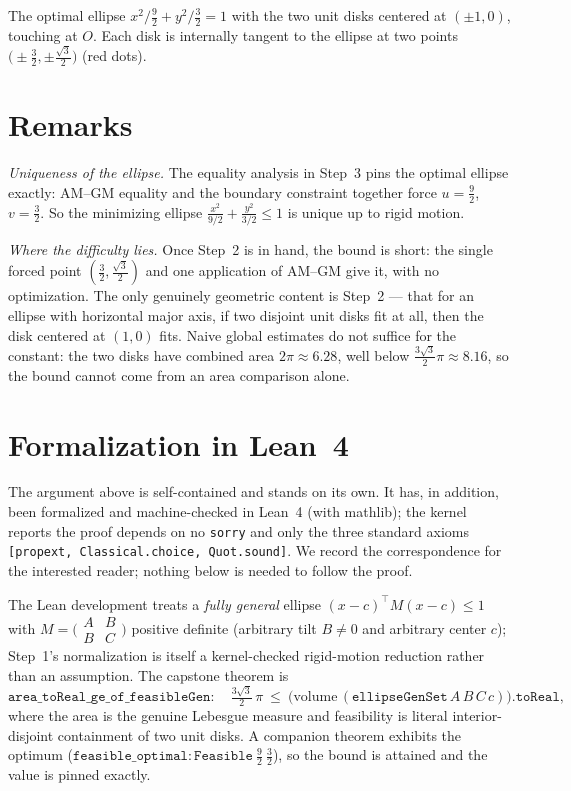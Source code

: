 \documentclass[11pt]{article}
\begin{document}
\noindent The optimal ellipse $x^2/\tfrac92+y^2/\tfrac32=1$ with the two unit disks
centered at $(\pm1,0)$, touching at $O$. Each disk is internally tangent to the ellipse at
two points $\bigl(\pm\tfrac32,\pm\tfrac{\sqrt3}{2}\bigr)$ (red dots).

\section*{Remarks}

\emph{Uniqueness of the ellipse.} The equality analysis in Step~3 pins the optimal ellipse exactly:
AM--GM equality and the boundary constraint together force $u=\tfrac92$, $v=\tfrac32$. So the
minimizing ellipse $\tfrac{x^2}{9/2}+\tfrac{y^2}{3/2}\le1$ is unique up to rigid motion.

\emph{Where the difficulty lies.} Once Step~2 is in hand, the bound is short: the single forced point
$(\tfrac32,\tfrac{\sqrt3}{2})$ and one application of AM--GM give it, with no optimization. The only
genuinely geometric content is Step~2 --- that for an ellipse with horizontal major axis, if two
disjoint unit disks fit at all, then the disk centered at $(1,0)$ fits. Naive global estimates do not
suffice for the constant: the two disks have combined area $2\pi\approx6.28$, well below
$\tfrac{3\sqrt3}{2}\pi\approx8.16$, so the bound cannot come from an area comparison alone.

\section*{Formalization in Lean~4}

The argument above is self-contained and stands on its own. It has, in addition, been formalized and
machine-checked in Lean~4 (with mathlib); the kernel reports the proof depends on no \texttt{sorry}
and only the three standard axioms \texttt{[propext, Classical.choice, Quot.sound]}. We record the
correspondence for the interested reader; nothing below is needed to follow the proof.

The Lean development treats a \emph{fully general} ellipse $(x-c)^{\!\top}M(x-c)\le1$ with
$M=\bigl(\begin{smallmatrix}A&B\\ B&C\end{smallmatrix}\bigr)$ positive definite (arbitrary tilt
$B\neq0$ and arbitrary center $c$); Step~1's normalization is itself a kernel-checked rigid-motion
reduction rather than an assumption. The capstone theorem is
\[
  \texttt{area\_toReal\_ge\_of\_feasibleGen}:\quad
  \tfrac{3\sqrt3}{2}\,\pi\ \le\ \bigl(\mathrm{volume}\,(\texttt{ellipseGenSet}\,A\,B\,C\,c)\bigr).\texttt{toReal},
\]
where the area is the genuine Lebesgue measure and feasibility is literal interior-disjoint
containment of two unit disks. A companion theorem exhibits the optimum
($\texttt{feasible\_optimal}: \texttt{Feasible}\ \tfrac92\ \tfrac32$), so the bound is attained and
the value is pinned exactly.
\end{document}
